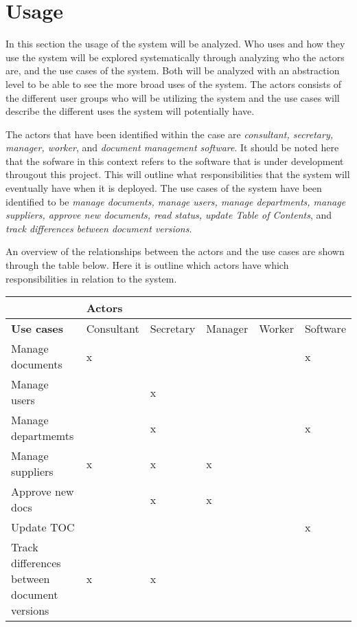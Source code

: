 \section{Usage}

In this section the usage of the system will be analyzed. Who uses and how they use the system will be explored systematically through analyzing who the actors are, and the use cases of the system.
Both will be analyzed with an abstraction level to be able to see the more broad uses of the system.
The actors consists of the different user groups who will be utilizing the system and the use cases will describe the different uses the system will potentially have.

The actors that have been identified within the case are \textit{consultant, secretary, manager, worker}, and \textit{document management software}.
It should be noted here that the sofware in this context refers to the software that is under development througout this project.
This will outline what responsibilities that the system will eventually have when it is deployed.
The use cases of the system have been identified to be \textit{manage documents, manage users, manage departments, manage suppliers, approve new documents, read status, update Table of Contents}, and \textit{track differences between document versions}.

An overview of the relationships between the actors and the use cases are shown through the table below. Here it is outline which actors have which responsibilities in relation to the system.

\begin{center}
\begin{tabular}{| m{10em} | m{4.5em} | m{4.5em} | m{4.5em} | m{4.5em} | m{} |}
	\hline
	& \textbf{Actors} & & & & \\
	\hline
	\textbf{Use cases} & Consultant & Secretary & Manager & Worker & Software \\
	\hline
	Manage documents & x & & & & x \\
	\hline
	Manage users & & x & & & \\
	\hline
	Manage departmemts & & x & & & x \\
	\hline
	Manage suppliers & x & x & x & &\\
	\hline
	Approve new docs & & x & x & & \\
	\hline
	Update TOC & & & & & x \\
	\hline
	Track differences between document versions & x & x & & &\\
	\hline
\end{tabular}
\end{center}

